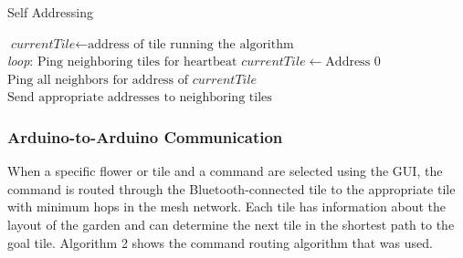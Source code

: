 \documentclass[letterpaper, 10 pt, conference]{ieeeconf}  %
\begin{document}
\begin{algorithm}
\caption{Self Addressing}\label{euclid}
\begin{algorithmic}[1]
\State $\textit{currentTile} \gets \text{address of tile running the algorithm}$\\

\BState \emph{loop}:
\State $\text{Ping neighboring tiles for heartbeat}$
\State $currentTile \gets \text{Address 0}$
\Else 
\State $\text{Ping all neighbors for address of } \textit{currentTile}$
\EndIf
\Else
\State $\text{Send appropriate addresses to neighboring tiles}$

\EndIf
\EndProcedure
\end{algorithmic}
\label{fig: alg1}
\end{algorithm}

\subsubsection{\textbf{Arduino-to-Arduino Communication}}
When a specific flower or tile and a command are selected using the GUI, the command is routed through the Bluetooth-connected tile to the appropriate tile with minimum hops in the mesh network.  Each tile has information about the layout of the garden and can determine the next tile in the shortest path to the goal tile.  Algorithm 2 shows the command routing algorithm that was used.
\end{document}
